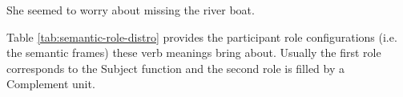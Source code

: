 \begin{exe}
    \ex\label{ex:glance2} She seemed to worry about missing the river boat.
\end{exe}

\begin{table}[!ht]
    \centering
    \caption{SF constituency analysis in Cardiff grammar style of Example \ref{ex:glance2}}
    \label{tab:glance-analsys}
\end{table}

Table \ref{tab:semantic-role-distro} provides the participant role configurations (i.e. the semantic frames) these verb meanings bring about. Usually the first role corresponds to the Subject function and the second role is filled by a Complement unit.

